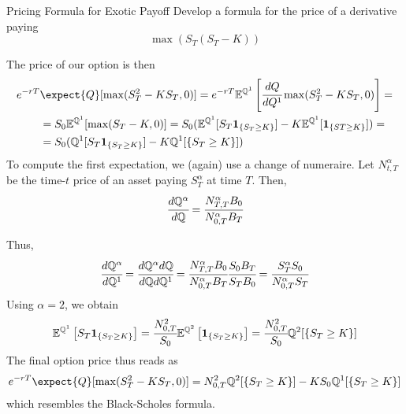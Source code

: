 \documentclass{beamer}
\begin{document}
\begin{frame}{}
\begin{block}{Pricing Formula for Exotic Payoff}
Develop a formula for the price of a derivative paying
\begin{equation*}
\max(S_T(S_T-K))
\end{equation*}
\end{block}
\end{frame}

\begin{frame}{}
The price of our option is then
\begin{equation*}
\begin{aligned}
e^{-rT}&\expect{Q}[\max(S^2_T-KS_T,0)]=e^{-rT}\mathbb{E}^{\mathbb{Q}^1}\left[\cfrac{dQ}{dQ^1}\max(S^2_T-KS_T,0)\right]= \\
&=S_0\mathbb{E}^{\mathbb{Q}^1}[\max(S_T-K,0)]= S_0(\mathbb{E}^{\mathbb{Q}^1}[S_T\bm{1}_{\{S_T\ge K\}}]-K\mathbb{E}^{\mathbb{Q}^1}[\bm{1}_{\{ST\ge K\}}])= \\
&=S_0(\mathbb{Q}^1[S_T\bm{1}_{\{S_T\ge K\}}]-K\mathbb{Q}^1[\{S_T\ge K\}])
\end{aligned}
\end{equation*}
To compute the first expectation, we (again) use a change of numeraire. Let $N^\alpha_{t,T}$ be the time-$t$  price of an asset paying $S^\alpha_T$ at time $T$. 
Then,
\begin{equation*}
\cfrac{d\mathbb{Q}^\alpha}{d\mathbb{Q}}=\cfrac{N^\alpha_{T,T}B_0}{N^\alpha_{0,T}B_T}
\end{equation*}
\end{frame}

\begin{frame}{}
Thus,
\begin{equation*}
\cfrac{d\mathbb{Q}^\alpha}{d\mathbb{Q}^1}=\cfrac{d\mathbb{Q}^\alpha d\mathbb{Q}}{d\mathbb{Q}d\mathbb{Q}^1}=\cfrac{N^\alpha_{T,T}B_0}{N^\alpha_{0,T}B_T}\cfrac{S_0B_T}{S_TB_0}=\cfrac{S^\alpha _TS_0}{N^\alpha_{0,T}S_T}
\end{equation*}
Using $\alpha=2$, we obtain
\begin{equation*}
\mathbb{E}^{\mathbb{Q}^1}\left[S_T\bm{1}_{\{S_T\ge K\}}\right]=\cfrac{N^2_{0,T}}{S_0}\mathbb{E}^{\mathbb{Q}^2}\left[\bm{1}_{\{S_T\ge K\}}\right]=\cfrac{N^2_{0,T}}{S_0}\mathbb{Q}^2[\{S_T\ge K\}]
\end{equation*}
The final option price thus reads as
\begin{equation*}
e^{-rT}\expect{Q}[\max(S^2_T-KS_T,0)]=N^2_{0,T}\mathbb{Q}^2[\{S_T\ge K\}]-KS_0\mathbb{Q}^1[\{S_T\ge K\}]
\end{equation*}
which resembles the Black-Scholes formula.
\end{frame}
\end{document}

